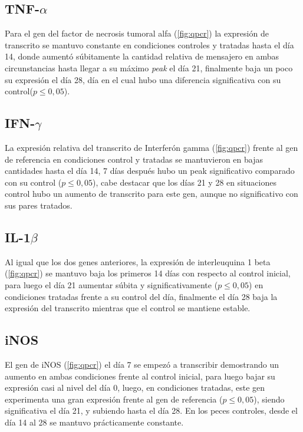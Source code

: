 \documentclass[12pt,letterpaper,oneside]{scrbook}
\begin{document}
\subsection{TNF-$\alpha$}

Para el gen del factor de necrosis tumoral alfa
(\ref{fig:qpcr}) la expresión de transcrito se
mantuvo constante en condiciones controles y tratadas hasta el día 14,
donde aumentó súbitamente la cantidad relativa de mensajero en ambas
circunstancias hasta llegar a su máximo \emph{peak} el día 21,
finalmente baja un poco su expresión el día 28, día en el cual hubo una
diferencia significativa con su control(\(p \leq 0,05\)).

\subsection{IFN-$\gamma$}

La expresión relativa del transcrito de Interferón gamma
(\ref{fig:qpcr}) frente al gen de referencia en
condiciones control y tratadas se mantuvieron en bajas cantidades hasta
el día 14, 7 días después hubo un peak significativo comparado con su
control (\(p \leq 0,05\)), cabe destacar que los días 21 y 28 en
situaciones control hubo un aumento de transcrito para este gen, aunque
no significativo con sus pares tratados.

\subsection{IL-1$\beta$}

Al igual que los dos genes anteriores, la expresión de interleuquina 1
beta (\ref{fig:qpcr}) se mantuvo baja los primeros
14 días con respecto al control inicial, para luego el día 21 aumentar
súbita y significativamente (\(p \leq 0,05\)) en condiciones tratadas
frente a su control del día, finalmente el día 28 baja la expresión del
transcrito mientras que el control se mantiene estable.

\subsection{iNOS}

El gen de iNOS (\ref{fig:qpcr}) el día 7 se empezó
a transcribir demostrando un aumento en ambas condiciones frente al
control inicial, para luego bajar su expresión casi al nivel del día 0,
luego, en condiciones tratadas, este gen experimenta una gran expresión
frente al gen de referencia (\(p \leq 0,05\)), siendo significativa el
día 21, y subiendo hasta el día 28. En los peces controles, desde el día
14 al 28 se mantuvo prácticamente constante.
\end{document}

